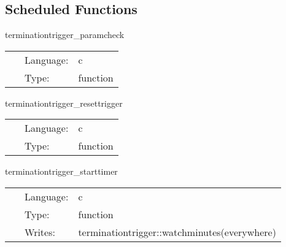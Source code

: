 \subsection*{Scheduled Functions}
\vspace{5mm}


\hspace{5mm} terminationtrigger\_paramcheck 

\hspace{5mm}{\it check consitency of parameters } 


\hspace{5mm}

 \begin{tabular*}{160mm}{cll} 
~ & Language:  & c \\ 
~ & Type:  & function \\ 
\end{tabular*} 


\vspace{5mm}


\hspace{5mm} terminationtrigger\_resettrigger 

\hspace{5mm}{\it clear trigger state } 


\hspace{5mm}

 \begin{tabular*}{160mm}{cll} 
~ & Language:  & c \\ 
~ & Type:  & function \\ 
\end{tabular*} 


\vspace{5mm}


\hspace{5mm} terminationtrigger\_starttimer 

\hspace{5mm}{\it start timer } 


\hspace{5mm}

 \begin{tabular*}{160mm}{cll} 
~ & Language:  & c \\ 
~ & Type:  & function \\ 
~ & Writes:  & terminationtrigger::watchminutes(everywhere) \\ 
\end{tabular*} 


